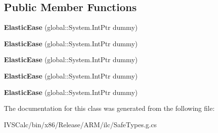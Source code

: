 \subsection*{Public Member Functions}
\begin{DoxyCompactItemize}
\item 
\mbox{\label{class_windows_1_1_u_i_1_1_xaml_1_1_media_1_1_animation_1_1_elastic_ease_a28d27cf0b62d409216201e9cc589f75e}} 
{\bfseries Elastic\+Ease} (global\+::\+System.\+Int\+Ptr dummy)
\item 
\mbox{\label{class_windows_1_1_u_i_1_1_xaml_1_1_media_1_1_animation_1_1_elastic_ease_a28d27cf0b62d409216201e9cc589f75e}} 
{\bfseries Elastic\+Ease} (global\+::\+System.\+Int\+Ptr dummy)
\item 
\mbox{\label{class_windows_1_1_u_i_1_1_xaml_1_1_media_1_1_animation_1_1_elastic_ease_a28d27cf0b62d409216201e9cc589f75e}} 
{\bfseries Elastic\+Ease} (global\+::\+System.\+Int\+Ptr dummy)
\item 
\mbox{\label{class_windows_1_1_u_i_1_1_xaml_1_1_media_1_1_animation_1_1_elastic_ease_a28d27cf0b62d409216201e9cc589f75e}} 
{\bfseries Elastic\+Ease} (global\+::\+System.\+Int\+Ptr dummy)
\item 
\mbox{\label{class_windows_1_1_u_i_1_1_xaml_1_1_media_1_1_animation_1_1_elastic_ease_a28d27cf0b62d409216201e9cc589f75e}} 
{\bfseries Elastic\+Ease} (global\+::\+System.\+Int\+Ptr dummy)
\end{DoxyCompactItemize}


The documentation for this class was generated from the following file\+:\begin{DoxyCompactItemize}
\item 
I\+V\+S\+Calc/bin/x86/\+Release/\+A\+R\+M/ilc/Safe\+Types.\+g.\+cs\end{DoxyCompactItemize}
